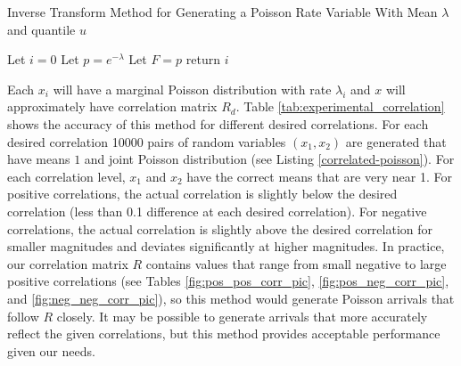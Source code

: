 \begin{algorithm}[H]
\SetAlgoLined
\caption{Inverse Transform Method for Generating a Poisson Rate Variable With Mean $\lambda$ and quantile $u$}
 Let $i = 0$\;
 Let $p = e^{-\lambda}$\;
 Let $F = p$\;
 return $i$ \;
\end{algorithm}

Each $x_i$ will have a marginal Poisson distribution with rate $\lambda_i$ and $x$ will approximately have correlation matrix $R_d$. Table \ref{tab:experimental_correlation} shows the accuracy of this method for different desired correlations. For each desired correlation 10000 pairs of random variables $(x_1,x_2)$ are generated that have means $1$ and joint Poisson distribution (see Listing \ref{correlated-poisson}). For each correlation level, $x_1$ and $x_2$ have the correct means that are very near 1. For positive correlations, the actual correlation is slightly below the desired correlation (less than 0.1 difference at each desired correlation). For negative correlations, the actual correlation is slightly above the desired correlation for smaller magnitudes and deviates significantly at higher magnitudes. In practice, our correlation matrix $R$ contains values that range from small negative to large positive correlations (see Tables \ref{fig:pos_pos_corr_pic}, \ref{fig:pos_neg_corr_pic}, and \ref{fig:neg_neg_corr_pic}), so this method would generate Poisson arrivals that follow $R$ closely. It may be possible to generate arrivals that more accurately reflect the given correlations, but this method provides acceptable performance given our needs.

